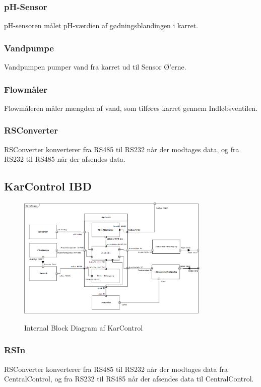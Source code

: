 \subsubsection{pH-Sensor}
pH-sensoren målet pH-værdien af gødningsblandingen i karret.

\subsubsection{Vandpumpe}
Vandpumpen pumper vand fra karret ud til Sensor Ø’erne.

\subsubsection{Flowmåler}
Flowmåleren måler mængden af vand, som tilføres karret gennem Indløbsventilen.


\subsubsection{RSConverter}
RSConverter konverterer fra RS485 til RS232 når der modtages data, og fra RS232 til RS485 når der afsendes data.



\subsection{KarControl IBD}

\begin{figure}[H]
	\centering
	\includegraphics[width=0.82\textwidth]{Systemarkitektur/KarControl/KarControl_IBD.png}
	\label{fig:KarControl IBD}
	\caption{Internal Block Diagram af KarControl}
\end{figure}

\subsubsection{RSIn}
RSConverter konverterer fra RS485 til RS232 når der modtages data fra CentralControl, og fra RS232 til RS485 når der afsendes data til CentralControl.

